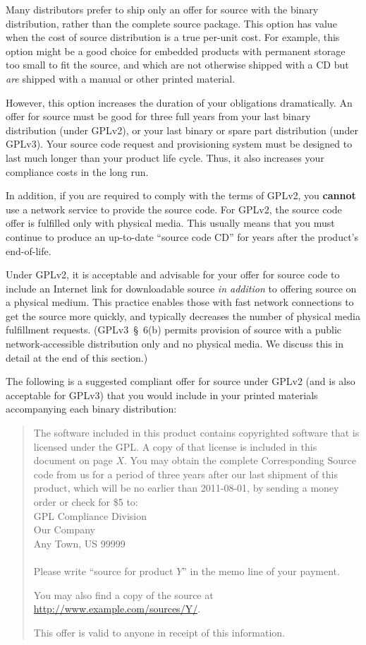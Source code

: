 Many distributors prefer to ship only an offer for source with the binary
distribution, rather than the complete source package.  This
option has value when the cost of source distribution is a true
per-unit cost.  For example, this option might be a good choice for
embedded products with permanent storage too small to fit the source, and
which are not otherwise shipped with a CD but \emph{are} shipped with a
manual or other printed material.

However, this option increases the duration of your obligations
dramatically.  An offer for source must be good for three full years from
your last binary distribution (under GPLv2), or your last binary or spare
part distribution (under GPLv3).  Your source code request and
provisioning system must be designed to last much longer than your product
life cycle. Thus, it also increases your compliance costs in the long
run.

In addition, if you are required to comply with the terms of GPLv2, you
{\bf cannot} use a network service to provide the source code.  For GPLv2,
the source code offer is fulfilled only with physical media.  This usually
means that you must continue to produce an up-to-date ``source code CD''
for years after the product's end-of-life.

\label{offer-with-internet}

Under GPLv2, it is acceptable and advisable for your offer for source code
to include an Internet link for downloadable source \emph{in addition} to
offering source on a physical medium.  This practice enables those with
fast network connections to get the source more quickly, and typically
decreases the number of physical media fulfillment requests.
(GPLv3~\S~6(b) permits provision of source with a public
network-accessible distribution only and no physical media.  We discuss
this in detail at the end of this section.)

The following is a suggested compliant offer for source under GPLv2 (and
is also acceptable for GPLv3) that you would include in your printed
materials accompanying each binary distribution:

\begin{quote}
The software included in this product contains copyrighted software that
is licensed under the GPL\@.  A copy of that license is included in this
document on page $X$\@.  You may obtain the complete Corresponding Source
code from us for a period of three years after our last shipment of this
product, which will be no earlier than 2011-08-01, by sending a money
order or check for \$5 to: \\
GPL Compliance Division \\
Our Company \\
Any Town, US 99999 \\
\\
Please write ``source for product $Y$'' in the memo line of your
payment.

You may also find a copy of the source at
\url{http://www.example.com/sources/Y/}.

This offer is valid to anyone in receipt of this information.
\end{quote}

